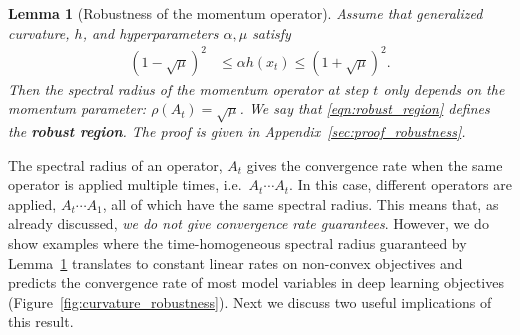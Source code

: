 \documentclass{article} %
\newtheorem{lemma}[theorem]{Lemma}
\newcommand{\mat}[1]{\bm{\mathit{#1}}}
\begin{document}
\begin{lemma}[Robustness of the momentum operator]
\label{lem:robustness}
Assume that generalized curvature, $h$, and hyperparameters $\alpha,\mu$ satisfy
\begin{align}
{(1-\sqrt{\mu})^2} &\leq \alpha h(x_t) \leq {(1+\sqrt{\mu})^2}.
\label{eqn:robust_region}
\end{align}
Then the spectral radius of the momentum operator at step $t$ only depends on the  momentum parameter: $	\rho(\mat{A}_t) = \sqrt{\mu}$. 
We say that \eqref{eqn:robust_region} defines the {\bf robust region}.
The proof is given in Appendix~\ref{sec:proof_robustness}.
\end{lemma}
The spectral radius of an operator, $A_t$ gives the convergence rate when the same operator is applied multiple times, i.e.\ $\mat{A}_t\cdots\mat{A}_t$.
In this case, different operators are applied, $\mat{A}_t\cdots\mat{A}_1$,
all of which have the same spectral radius. 
This means that, as already discussed, {\em we do not give convergence rate guarantees}.
However, we do show examples where the time-homogeneous spectral radius guaranteed by Lemma~\ref{lem:robustness} translates to constant linear rates on non-convex objectives and predicts the convergence rate of most model variables in deep learning objectives (Figure~\ref{fig:curvature_robustness}).
Next we discuss two useful implications of this result.
\end{document}
